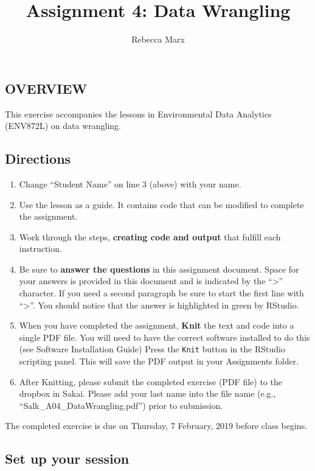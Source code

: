 \documentclass[]{article}
\title{Assignment 4: Data Wrangling}
\author{Rebecca Marx}
\date{}
\providecommand{\tightlist}{%
  \setlength{\itemsep}{0pt}\setlength{\parskip}{0pt}}
\begin{document}
\maketitle

\subsection{OVERVIEW}\label{overview}

This exercise accompanies the lessons in Environmental Data Analytics
(ENV872L) on data wrangling.

\subsection{Directions}\label{directions}

\begin{enumerate}
\def\labelenumi{\arabic{enumi}.}
\tightlist
\item
  Change ``Student Name'' on line 3 (above) with your name.
\item
  Use the lesson as a guide. It contains code that can be modified to
  complete the assignment.
\item
  Work through the steps, \textbf{creating code and output} that fulfill
  each instruction.
\item
  Be sure to \textbf{answer the questions} in this assignment document.
  Space for your answers is provided in this document and is indicated
  by the ``\textgreater{}'' character. If you need a second paragraph be
  sure to start the first line with ``\textgreater{}''. You should
  notice that the answer is highlighted in green by RStudio.
\item
  When you have completed the assignment, \textbf{Knit} the text and
  code into a single PDF file. You will need to have the correct
  software installed to do this (see Software Installation Guide) Press
  the \texttt{Knit} button in the RStudio scripting panel. This will
  save the PDF output in your Assignments folder.
\item
  After Knitting, please submit the completed exercise (PDF file) to the
  dropbox in Sakai. Please add your last name into the file name (e.g.,
  ``Salk\_A04\_DataWrangling.pdf'') prior to submission.
\end{enumerate}

The completed exercise is due on Thursday, 7 February, 2019 before class
begins.

\subsection{Set up your session}\label{set-up-your-session}
\end{document}
